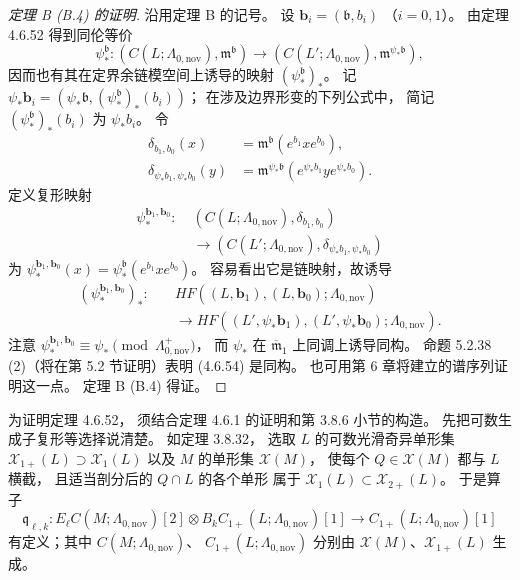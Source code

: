 \begin{proof}[定理 B (B.4) 的证明]
沿用定理 B 的记号。
设 $\boldsymbol b_i=(\mathfrak b,b_i)$
（$i=0,1$）。
由定理 4.6.52 得到同伦等价
\[
\psi_*^{\mathfrak b}\colon
(C(L;\Lambda_{0,\mathrm{nov}}),\mathfrak m^{\mathfrak b})
\longrightarrow
(C(L';\Lambda_{0,\mathrm{nov}}),
 \mathfrak m^{\psi_*\mathfrak b}),
\]
因而也有其在定界余链模空间上诱导的映射
$(\psi_*^{\mathfrak b})_*$。
记
$\psi_*\boldsymbol b_i
=(\psi_*\mathfrak b,(\psi_*^{\mathfrak b})_*(b_i))$；
在涉及边界形变的下列公式中，
简记 $(\psi_*^{\mathfrak b})_*(b_i)$ 为 $\psi_*b_i$。
令
\[
\begin{aligned}
\delta_{b_1,b_0}(x)
 &=\mathfrak m^{\mathfrak b}(e^{b_1}xe^{b_0}),\\
\delta_{\psi_*b_1,\psi_*b_0}(y)
 &=\mathfrak m^{\psi_*\mathfrak b}
   (e^{\psi_*b_1}ye^{\psi_*b_0}).
\end{aligned}
\]
定义复形映射
\[
\begin{aligned}
\psi_*^{\boldsymbol b_1,\boldsymbol b_0}\colon\;
&(C(L;\Lambda_{0,\mathrm{nov}}),\delta_{b_1,b_0})\\
&\longrightarrow
(C(L';\Lambda_{0,\mathrm{nov}}),
 \delta_{\psi_*b_1,\psi_*b_0})
\end{aligned}
\]
为
$\psi_*^{\boldsymbol b_1,\boldsymbol b_0}(x)
=\psi_*^{\mathfrak b}(e^{b_1}xe^{b_0})$。
容易看出它是链映射，故诱导
\begin{equation}
\begin{aligned}
(\psi_*^{\boldsymbol b_1,\boldsymbol b_0})_*\colon\quad
&HF((L,\boldsymbol b_1),(L,\boldsymbol b_0);
     \Lambda_{0,\mathrm{nov}})\\
&\longrightarrow
HF((L',\psi_*\boldsymbol b_1),
   (L',\psi_*\boldsymbol b_0);
   \Lambda_{0,\mathrm{nov}}).
\end{aligned}
\tag{4.6.54}\label{eq:4-6-54}
\end{equation}
注意
$\psi_*^{\boldsymbol b_1,\boldsymbol b_0}
\equiv\psi_*\pmod{\Lambda^+_{0,\mathrm{nov}}}$，
而 $\psi_*$ 在 $\overline{\mathfrak m}_1$
上同调上诱导同构。
命题 5.2.38 (2)（将在第 5.2 节证明）表明
(4.6.54) 是同构。
也可用第 6 章将建立的谱序列证明这一点。
定理 B (B.4) 得证。
\end{proof}

为证明定理 4.6.52，
须结合定理 4.6.1 的证明和第 3.8.6 小节的构造。
先把可数生成子复形等选择说清楚。
如定理 3.8.32，
选取 $L$ 的可数光滑奇异单形集
$\mathcal X_{1+}(L)\supset\mathcal X_1(L)$
以及 $M$ 的单形集 $\mathcal X(M)$，
使每个 $Q\in\mathcal X(M)$ 都与 $L$ 横截，
且适当剖分后的 $Q\cap L$ 的各个单形
属于 $\mathcal X_1(L)\subset\mathcal X_{2+}(L)$。
于是算子
\[
\mathfrak q_{\ell,k}\colon
E_\ell C(M;\Lambda_{0,\mathrm{nov}})[2]
\otimes B_kC_{1+}(L;\Lambda_{0,\mathrm{nov}})[1]
\longrightarrow
C_{1+}(L;\Lambda_{0,\mathrm{nov}})[1]
\]
有定义；其中 $C(M;\Lambda_{0,\mathrm{nov}})$、
$C_{1+}(L;\Lambda_{0,\mathrm{nov}})$
分别由 $\mathcal X(M)$、$\mathcal X_{1+}(L)$ 生成。

